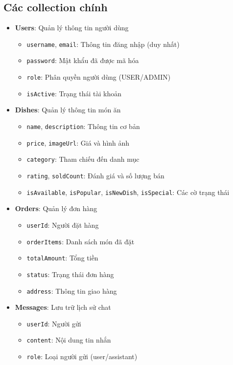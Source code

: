 \subsection{Các collection chính}
\begin{itemize}
    \item \textbf{Users}: Quản lý thông tin người dùng
    \begin{itemize}
        \item \texttt{username}, \texttt{email}: Thông tin đăng nhập (duy nhất)
        \item \texttt{password}: Mật khẩu đã được mã hóa
        \item \texttt{role}: Phân quyền người dùng (USER/ADMIN)
        \item \texttt{isActive}: Trạng thái tài khoản
    \end{itemize}
    
    \item \textbf{Dishes}: Quản lý thông tin món ăn
    \begin{itemize}
        \item \texttt{name}, \texttt{description}: Thông tin cơ bản
        \item \texttt{price}, \texttt{imageUrl}: Giá và hình ảnh
        \item \texttt{category}: Tham chiếu đến danh mục
        \item \texttt{rating}, \texttt{soldCount}: Đánh giá và số lượng bán
        \item \texttt{isAvailable}, \texttt{isPopular}, \texttt{isNewDish}, \texttt{isSpecial}: Các cờ trạng thái
    \end{itemize}
    
    \item \textbf{Orders}: Quản lý đơn hàng
    \begin{itemize}
        \item \texttt{userId}: Người đặt hàng
        \item \texttt{orderItems}: Danh sách món đã đặt
        \item \texttt{totalAmount}: Tổng tiền
        \item \texttt{status}: Trạng thái đơn hàng
        \item \texttt{address}: Thông tin giao hàng
    \end{itemize}
    
    \item \textbf{Messages}: Lưu trữ lịch sử chat
    \begin{itemize}
        \item \texttt{userId}: Người gửi
        \item \texttt{content}: Nội dung tin nhắn
        \item \texttt{role}: Loại người gửi (user/assistant)
    \end{itemize}
\end{itemize}

